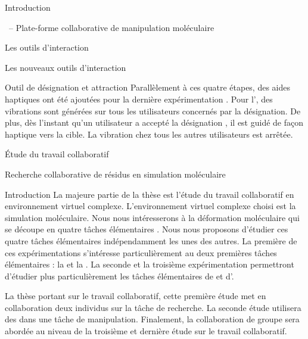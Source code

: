 \documentclass[myfrancais]{mythesis}
\begin{document}
\begin{mypart}{Introduction}
\begin{mychapter}{\myShaddock\ -- Plate-forme collaborative de manipulation moléculaire}
\begin{mysection}{Les outils d'interaction}
\begin{mysubsection}{Les nouveaux outils d'interaction}
\begin{mysubsubsection}{Outil de désignation et attraction}
						Parallèlement à ces quatre étapes, des aides haptiques ont été ajoutées pour la dernière expérimentation .
						Pour l', des vibrations sont générées sur tous les utilisateurs concernés par la désignation.
						De plus, dès l'instant qu'un utilisateur a accepté la désignation , il est guidé de façon haptique vers la cible.
						La vibration chez tous les autres utilisateurs est arrêtée.
					\end{mysubsubsection}
				\end{mysubsection}
			\end{mysection}
		\end{mychapter}
	\end{mypart}
	\begin{mypart}{Étude du travail collaboratif}
		\begin{mychapter}{Recherche collaborative de résidus en simulation moléculaire}
			\begin{mysection}{Introduction}
				La majeure partie de la thèse est l'étude du travail collaboratif en environnement virtuel complexe.
				L'environnement virtuel complexe choisi est la simulation moléculaire.
				Nous nous intéresserons à la déformation moléculaire qui se découpe en quatre tâches élémentaires .
				Nous nous proposons d'étudier ces quatre tâches élémentaires indépendamment les unes des autres.
				La première de ces expérimentations s'intéresse particulièrement au deux premières tâches élémentaires : la  et la .
				La seconde et la troisième expérimentation permettront d'étudier plus particulièrement les tâches élémentaires de  et d'.

				La thèse portant sur le travail collaboratif, cette première étude met en collaboration deux individus sur la tâche de recherche.
				La seconde étude utilisera des  dans une tâche de manipulation.
				Finalement, la collaboration de groupe sera abordée au niveau de la troisième et dernière étude sur le travail collaboratif.


\end{mysection}
\end{mychapter}
\end{mypart}
\end{document}
